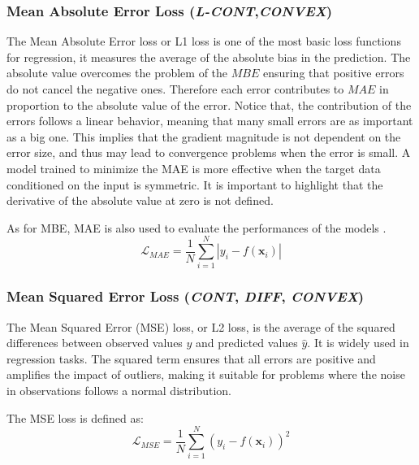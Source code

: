 \documentclass[sn-mathphys-num]{sn-jnl}%
\newcommand \cont{\textit{CONT}}
\newcommand \lcont{\textit{L-CONT}}
\newcommand \diff{\textit{DIFF}}
\newcommand \conv{\textit{CONVEX}}
\renewcommand\vec{\mathbf}
\begin{document}
    \subsubsection{Mean Absolute Error Loss (\lcont,\conv)}\label{subsubsec-regression_MAE}
    The Mean Absolute Error loss or L1 loss is one of the most basic loss functions for regression, it measures the average of the absolute bias in the prediction. The absolute value overcomes the problem of the $MBE$ ensuring that positive errors do not cancel the negative ones. Therefore each error contributes to $MAE$ in proportion to the absolute value of the error.
    Notice that, the contribution of the errors follows a linear behavior, meaning that many small errors are as important as a big one. This implies that the gradient magnitude is not dependent on the error size, and thus may lead to convergence problems when the error is small. 
    A model trained to minimize the MAE is more effective when the target data conditioned on the input is symmetric.
    It is important to highlight that the derivative of the absolute value at zero is not defined. 
    
    As for MBE, MAE is also used to evaluate the performances of the models \cite{willmott2005advantages, li2010comparing}.
    \begin{equation}
        \mathcal{L}_{MAE} = \frac{1}{N} \sum_{i=1}^{N} \left | y_i - f(\vec{x}_i) \right |
    \end{equation}

    \subsubsection{Mean Squared Error Loss (\cont, \diff, \conv)}\label{subsubsec-regression_MSE}
    The Mean Squared Error (MSE) loss, or L2 loss, is the average of the squared differences between observed values $y$ and predicted values $\hat{y}$. It is widely used in regression tasks. The squared term ensures that all errors are positive and amplifies the impact of outliers, making it suitable for problems where the noise in observations follows a normal distribution.

    The MSE loss is defined as:
    \begin{equation}
        \mathcal{L}_{MSE} = \frac{1}{N} \sum_{i=1}^{N} \left ( y_i - f(\vec{x}_i) \right )^{2}
    \end{equation}
\end{document}
